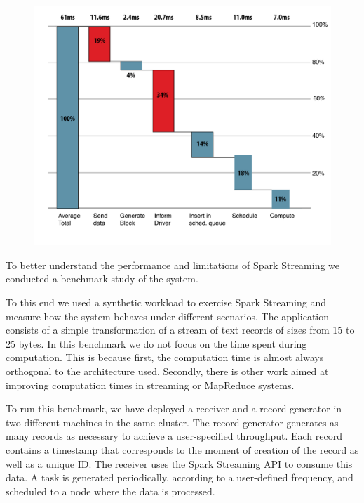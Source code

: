 \begin{figure}[t!]
  \begin{center}
    \includegraphics[scale=0.40]{images_graphs/waterfall/Rplots_illustrator.pdf}
  \end{center}
  \caption{}
  \label{fig:SparkStreaming_time_breakdown}
\end{figure}

To better understand the performance and limitations of Spark Streaming we conducted a benchmark study of the system.

To this end we used a synthetic workload to exercise Spark Streaming and measure how the system behaves under different scenarios.
The application consists of a simple transformation of a stream of text records of sizes from 15 to 25 bytes.
In this benchmark we do not focus on the time spent during computation.
This is because first, the computation time is almost always orthogonal to the architecture used.
Secondly, there is other work aimed at improving computation times in streaming or MapReduce systems.

To run this benchmark, we have deployed a receiver and a record generator in two different machines in the same cluster. 
The record generator generates as many records as necessary to achieve a user-specified throughput.
Each record contains a timestamp that corresponds to the moment of creation of the record as well as a unique ID.
The receiver uses the Spark Streaming API to consume this data. 
A task is generated periodically, according to a user-defined frequency, and scheduled to a node where the data is processed.

